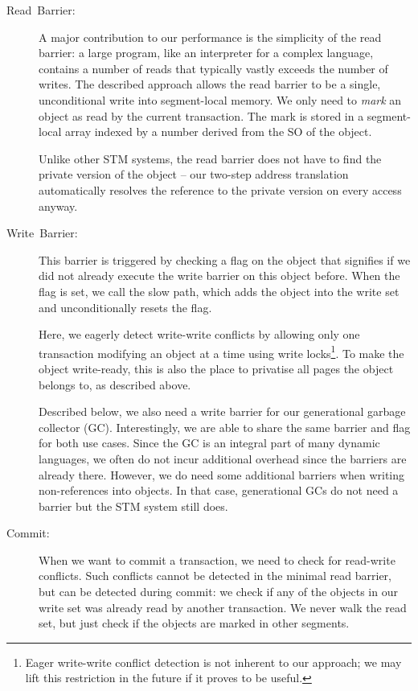 \documentclass{sigplanconf}
\begin{document}
\begin{description}

\item [{Read~Barrier:}] A major contribution to our performance
  is the simplicity of the read barrier: a large program, like an
  interpreter for a complex language, contains a number of reads that
  typically vastly exceeds the number of writes.  The described
  approach allows the read barrier to be a single, unconditional
  write into segment-local memory. We only need to \emph{mark} an object
  as read by the current transaction. The mark is stored in a
  segment-local array indexed by a number derived from the SO
  of the object.

  Unlike other STM systems, the read barrier does not have to find the
  private version of the object -- our two-step address translation
  automatically resolves the reference to the private version on every
  access anyway.

\item [{Write~Barrier:}] This barrier is triggered by checking a flag
  on the object that signifies if we did not already execute the write
  barrier on this object before.  When the flag is set, we call the slow
  path, which adds the object into the write set and unconditionally
  resets the flag.

  Here, we eagerly detect write-write conflicts by allowing only one
  transaction modifying an object at a time using write
  locks\footnote{Eager write-write conflict detection is not inherent
    to our approach; we may lift this restriction in the future if it
    proves to be useful.}. To make the object write-ready, this is
  also the place to privatise all pages the object belongs to, as
  described above.

  Described below, we also need a write barrier for our generational
  garbage collector (GC). Interestingly, we are able to share the same
  barrier and flag for both use cases. Since the GC is an integral
  part of many dynamic languages, we often do not incur additional
  overhead since the barriers are already there. However, we do need
  some additional barriers when writing non-references into objects.
  In that case, generational GCs do not need a barrier but the STM
  system still does.

\item [{Commit:}] When we want to commit a transaction, we need to check
  for read-write conflicts.  Such conflicts cannot be detected in the
  minimal read barrier, but can be detected during commit: we check
  if any of the objects in our write set was already read by another
  transaction. We never walk the read set, but just check if the objects
  are marked in other segments.


\end{description}
\end{document}

